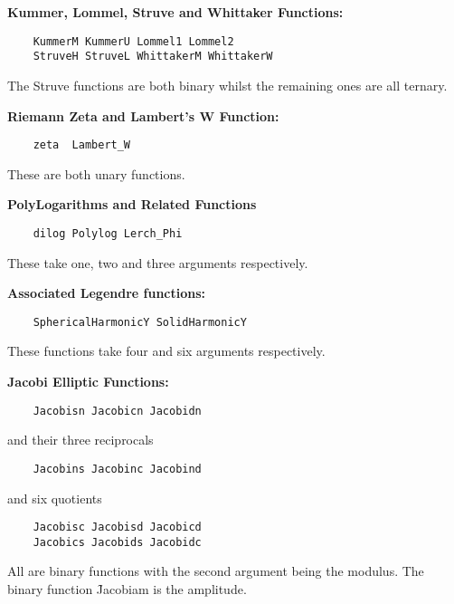 \textbf{Kummer, Lommel, Struve and Whittaker Functions:}
\begin{verbatim}
    KummerM KummerU Lommel1 Lommel2
    StruveH StruveL WhittakerM WhittakerW
\end{verbatim}
The Struve functions are both binary whilst the remaining ones are all ternary.

 
\textbf{Riemann Zeta and Lambert's W Function:}
\begin{verbatim}
    zeta  Lambert_W
\end{verbatim}
These are both unary functions.

 
\textbf{PolyLogarithms and Related Functions}
\begin{verbatim}
    dilog Polylog Lerch_Phi
\end{verbatim}
These take one, two and three arguments respectively.

\textbf{Associated Legendre functions:}
\begin{verbatim}
    SphericalHarmonicY SolidHarmonicY
\end{verbatim}
These functions take four and six arguments respectively.

\textbf{Jacobi Elliptic Functions:}
\begin{verbatim}
    Jacobisn Jacobicn Jacobidn
\end{verbatim}
and their three reciprocals
\begin{verbatim}
    Jacobins Jacobinc Jacobind
\end{verbatim}
and six quotients
\begin{verbatim}
    Jacobisc Jacobisd Jacobicd
    Jacobics Jacobids Jacobidc
\end{verbatim}
All are binary functions with the second argument being the modulus.
The binary function \f{Jacobiam} is the amplitude.

